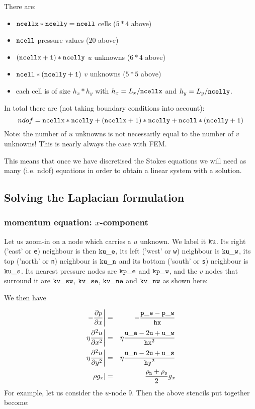 There are:
\begin{itemize}
\item ${\tt ncellx}*{\tt ncelly}={\tt ncell}$ cells ($5*4$ above)
\item ${\tt ncell}$ pressure values ($20$ above)
\item ${\tt (ncellx+1)}*{\tt ncelly}$ $u$ unknowns ($6*4$ above) 
\item ${\tt ncell}*{\tt (ncelly+1)}$ $v$ unknowns ($5*5$ above) 
\item each cell is of size $h_x * h_y$ with $h_x=L_x/{\tt ncellx}$ 
and $h_y=L_y/{\tt ncelly}$.
\end{itemize}
In total there are (not taking boundary conditions into account):
\[
ndof= {\tt ncellx}*{\tt ncelly} 
+ {\tt (ncellx+1)}*{\tt ncelly}
+ {\tt ncell}*{\tt (ncelly+1)}
\]
Note: the number of $u$ unknowns is not necessarily equal to the number of $v$
unknowns! This is nearly always the case with FEM. 

This means that once we have discretised the Stokes equations we will need
as many (i.e. ndof) equations in order to obtain a linear system with a solution.

\subsection{Solving the Laplacian formulation}

\subsubsection{momentum equation: $x$-component}

Let us zoom-in on a node which carries a $u$ unknown. 
We label it ${\tt ku}$. Its right ('east' or {\tt e})  neighbour is then ${\tt ku\_e}$,
its left ('west' or {\tt w}) neighbour is ${\tt ku\_w}$, 
its top ('north' or {\tt n}) neighbour is ${\tt ku\_n}$ and 
its bottom ('south' or {\tt s}) neighbour is ${\tt ku\_s}$.
Its nearest pressure nodes are ${\tt kp\_e}$ and ${\tt kp\_w}$, and the $v$ nodes
that surround it are ${\tt kv\_sw}$, ${\tt kv\_se}$, ${\tt kv\_ne}$ and ${\tt kv\_nw}$
as shown here:



We then have

\begin{eqnarray}
\left. -\frac{\partial p}{\partial x} \right|
&=& -\frac{{\tt p\_e}-{\tt p\_w}}{\tt hx}       \nonumber\\
\left. \eta \frac{\partial^2 u}{\partial x^2} \right|
&=& \eta \frac{{\tt u\_e} -2{\tt u}+{\tt u\_w}}{{\tt hx}^2}  \nonumber\\
\left. \eta \frac{\partial^2 u}{\partial y^2} \right|
&=& \eta \frac{{\tt u\_n}-2{\tt u}+{\tt u\_s}}{{\tt hy}^2}  \nonumber\\
\left. \rho g_x \right| 
&=& \frac{\rho_{\tt n} + \rho_{\tt s}}{2} g_x   \nonumber
\end{eqnarray}
For example, let us consider the $u$-node 9. Then the above stencils put together become:

